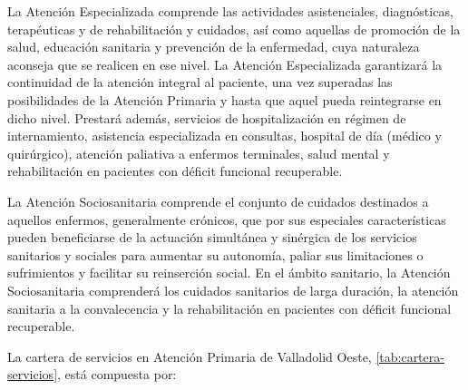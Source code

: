 La Atención Especializada comprende las actividades asistenciales, diagnósticas, terapéuticas y de rehabilitación y cuidados, así como aquellas de promoción de la salud, educación sanitaria y prevención de la enfermedad, cuya naturaleza aconseja que se realicen en ese nivel. La Atención Especializada garantizará la continuidad de la atención integral al paciente, una vez superadas las posibilidades de la Atención Primaria y hasta que aquel pueda reintegrarse en dicho nivel. Prestará además, servicios de hospitalización en régimen de internamiento, asistencia especializada en consultas, hospital de día (médico y quirúrgico), atención paliativa a enfermos terminales, salud mental y rehabilitación en pacientes con déficit funcional recuperable.

La Atención Sociosanitaria comprende el conjunto de cuidados destinados a aquellos enfermos, generalmente crónicos, que por sus especiales características pueden beneficiarse de la actuación simultánea y sinérgica de los servicios sanitarios y sociales para aumentar su autonomía, paliar sus limitaciones o sufrimientos y facilitar su reinserción social. En el ámbito sanitario, la Atención Sociosanitaria comprenderá los cuidados sanitarios de larga duración, la atención sanitaria a la convalecencia y la rehabilitación en pacientes con déficit funcional recuperable.

La cartera de servicios en Atención Primaria de Valladolid Oeste, \cref{tab:cartera-servicios}, está compuesta por:

